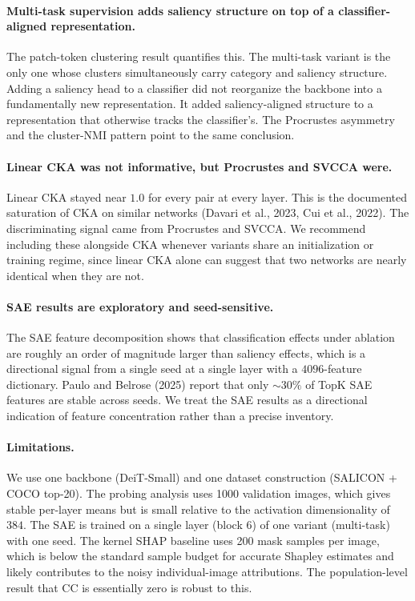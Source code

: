 \documentclass{article}
\begin{document}
\paragraph{Multi-task supervision adds saliency structure on top of a classifier-aligned representation.}
The patch-token clustering result quantifies this. The multi-task variant is the only one whose clusters simultaneously carry category and saliency structure. Adding a saliency head to a classifier did not reorganize the backbone into a fundamentally new representation. It added saliency-aligned structure to a representation that otherwise tracks the classifier's. The Procrustes asymmetry and the cluster-NMI pattern point to the same conclusion.

\paragraph{Linear CKA was not informative, but Procrustes and SVCCA were.}
Linear CKA stayed near $1.0$ for every pair at every layer. This is the documented saturation of CKA on similar networks (Davari et al., 2023, Cui et al., 2022). The discriminating signal came from Procrustes and SVCCA. We recommend including these alongside CKA whenever variants share an initialization or training regime, since linear CKA alone can suggest that two networks are nearly identical when they are not.

\paragraph{SAE results are exploratory and seed-sensitive.}
The SAE feature decomposition shows that classification effects under ablation are roughly an order of magnitude larger than saliency effects, which is a directional signal from a single seed at a single layer with a $4096$-feature dictionary. Paulo and Belrose (2025) report that only $\sim 30\%$ of TopK SAE features are stable across seeds. We treat the SAE results as a directional indication of feature concentration rather than a precise inventory.

\paragraph{Limitations.}
We use one backbone (DeiT-Small) and one dataset construction (SALICON + COCO top-20). The probing analysis uses 1000 validation images, which gives stable per-layer means but is small relative to the activation dimensionality of $384$. The SAE is trained on a single layer (block 6) of one variant (multi-task) with one seed. The kernel SHAP baseline uses 200 mask samples per image, which is below the standard sample budget for accurate Shapley estimates and likely contributes to the noisy individual-image attributions. The population-level result that CC is essentially zero is robust to this.
\end{document}
